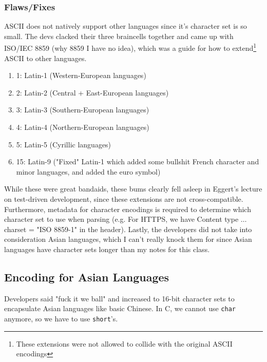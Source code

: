 \documentclass[13pt]{article}
\begin{document}
\subsubsection{Flaws/Fixes}
ASCII does not natively support other languages since it's character set is so small. The devs clacked their three braincells together and came up with ISO/IEC 8859 (why 8859 I have no idea), which was a guide for how to extend\footnote{These extensions were not allowed to collide with the original ASCII encodings} ASCII to other languages.

\begin{enumerate}[label=8859-]
\item 1: Latin-1 (Western-European languages)
\item 2: Latin-2 (Central + East-European languages)
\item 3: Latin-3 (Southern-European languages)
\item 4: Latin-4 (Northern-European languages)
\item 5: Latin-5 (Cyrillic languages)
\item 15: Latin-9 ("Fixed" Latin-1 which added some bullshit French character and minor languages, and added the euro symbol)
\end{enumerate}
While these were great bandaids, these bums clearly fell asleep in Eggert's lecture on test-driven development, since these extensions are not cross-compatible. Furthermore, metadata for character encodings is required to determine which character set to use when parsing (e.g. For HTTPS, we have Content type $\ldots$ charset = "ISO 8859-1" in the header). Lastly, the developers did not take into consideration Asian languages, which I can't really knock them for since Asian languages have character sets longer than my notes for this class.





\subsection{Encoding for Asian Languages}
Developers said "fuck it we ball" and increased to 16-bit character sets to encapsulate Asian languages like basic Chinese. In C, we cannot use \texttt{char} anymore, so we have to use \texttt{short}'s. 
\end{document}
